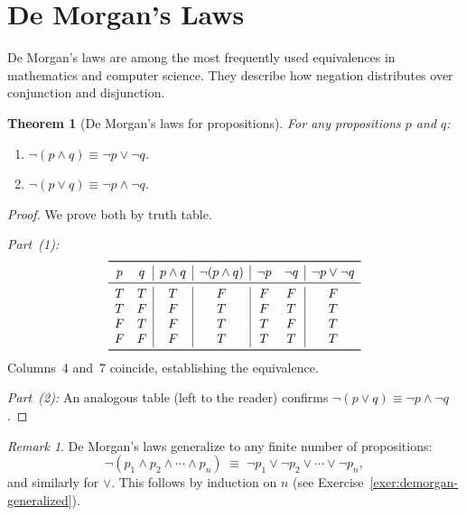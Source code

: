 \documentclass[12pt,a4paper,openany]{book}
\theoremstyle{definition}
\theoremstyle{plain}
\newtheorem{theorem}[definition]{Theorem}
\theoremstyle{remark}
\newtheorem{remark}[definition]{Remark}
\begin{document}
\section{De Morgan's Laws}
\label{sec:demorgan}

De Morgan's laws are among the most frequently used equivalences in mathematics and
computer science. They describe how negation distributes over conjunction and disjunction.

\begin{theorem}[De Morgan's laws for propositions]
\label{thm:demorgan-prop}
For any propositions $p$ and $q$:
\begin{enumerate}[nosep]
  \item $\lnot(p \land q) \equiv \lnot p \lor \lnot q$.
  \item $\lnot(p \lor q) \equiv \lnot p \land \lnot q$.
\end{enumerate}
\end{theorem}

\begin{proof}
We prove both by truth table.

\medskip
\noindent\emph{Part~(1):}
\[
\begin{array}{cc|c|c|cc|c}
\toprule
p & q & p \land q & \lnot(p \land q) & \lnot p & \lnot q & \lnot p \lor \lnot q \\
\midrule
T & T & T & F & F & F & F \\
T & F & F & T & F & T & T \\
F & T & F & T & T & F & T \\
F & F & F & T & T & T & T \\
\bottomrule
\end{array}
\]
Columns~4 and~7 coincide, establishing the equivalence.

\medskip
\noindent\emph{Part~(2):} An analogous table (left to the reader) confirms
$\lnot(p \lor q) \equiv \lnot p \land \lnot q$.
\end{proof}

\begin{remark}
\label{rem:demorgan-generalized}
De Morgan's laws generalize to any finite number of propositions:
\[
  \lnot(p_1 \land p_2 \land \cdots \land p_n)
  \;\equiv\;
  \lnot p_1 \lor \lnot p_2 \lor \cdots \lor \lnot p_n,
\]
and similarly for $\lor$. This follows by induction on $n$
(see Exercise~\ref{exer:demorgan-generalized}).
\end{remark}
\end{document}
